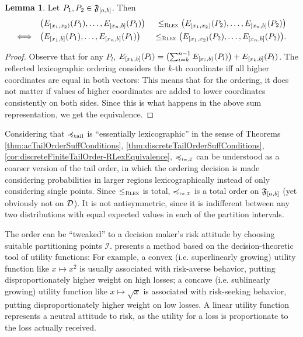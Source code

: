\documentclass[a4paper]{scrreprt}
\theoremstyle{definition}
\newtheorem{lemma}[thm]{Lemma} %
\begin{document}
    \begin{lemma}
        Let $P_1, P_2 \in \mathfrak{F}_{[a, b]}$.
        Then
        \begin{alignat*}{3}
                                     &\bigl(E_{[x_1, x_2)}(P_{1}), \dots, E_{[x_n, b]}(P_1)\bigr)\; &\leq_{\textsc{Rlex}} \bigl(E_{[x_1, x_2)}(P_2), \dots, E_{[x_n, b]}(P_2)\bigr) \\
            \Longleftrightarrow\quad &\bigl(E_{[x_1, b]}(P_{1}), \dots, E_{[x_n, b]}(P_1)\bigr) &\leq_{\textsc{Rlex}} \bigl(E_{[x_1, x_2)}(P_2), \dots, E_{[x_n, b]}(P_2)\bigr).
        \end{alignat*}
    \end{lemma}
    \begin{proof}
        Observe that for any $P_l$, $E_{[x_k, b]}(P_l) = \bigl(\sum_{i=k}^{n-1} E_{[x_i, b)}(P_l)\bigr) + E_{[x_k, b]}(P_l)$.
        The reflected lexicographic ordering considers the $k$-th coordinate iff all higher coordinates are equal in both vectors:
        This means that for the ordering, it does not matter if values of higher coordinates are added to lower coordinates consistently on both sides.
        Since this is what happens in the above sum representation, we get the equivalence.
    \end{proof}

    Considering that $\preccurlyeq_{\text{tail}}$ is “essentially lexicographic” in the sense of Theorems \ref{thm:acTailOrderSuffConditions}, \ref{thm:discreteTailOrderSuffConditions}, \ref{cor:discreteFiniteTailOrder-RLexEquivalence},
    $\leqtw$ can be understood as a coarser version of the tail order, in which the ordering decision is made considering probabilities in larger regions lexicographically instead of only considering single points.
    Since $\leq_{\textsc{Rlex}}$ is total, $\leqtw$ is a total order on $\mathfrak{F}_{[a, b]}$ (yet obviously not on $\mathcal{D}$). It is not antisymmetric, since it is indifferent between any two distributions with equal expected values in each of the partition intervals.
    
    The order can be “tweaked” to a decision maker's risk attitude by choosing suitable partitioning points $\mathcal{I}$. \cite{bib:tweakableStochasticOrders} presents a method based on the decision-theoretic tool of utility functions: For example, a convex (i.e. superlinearly growing) utility function like $x \mapsto x^2$ is usually associated with risk-averse behavior, putting disproportionately higher weight on high losses; a concave (i.e. sublinearly growing) utility function like $x \mapsto \sqrt{x}$ is associated with risk-seeking behavior, putting disproportionately higher weight on low losses. A linear utility function represents a neutral attitude to risk, as the utility for a loss is proportionate to the loss actually received.
    
\end{document}
